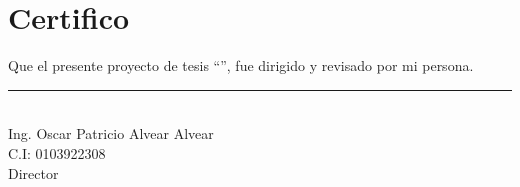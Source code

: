 \chapter*{Certifico}
\vspace{3cm}

Que el presente proyecto de tesis “\titulotesis{}”, fue dirigido y revisado por mi persona.

\vspace{5cm}


\begin{center}
    \noindent\rule{8cm}{0.4pt}\\
    Ing. Oscar Patricio Alvear Alvear\\
    C.I: 0103922308\\
    Director
\end{center}
